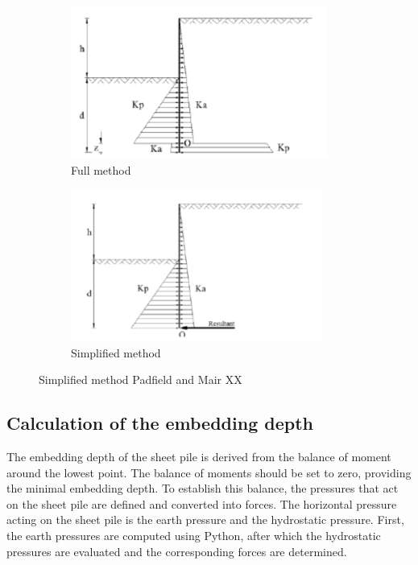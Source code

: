 \begin{figure}[H]
    \centering
    \begin{subfigure}[b]{0.45\textwidth}
        \includegraphics[width=\linewidth, height=5cm]{figures/ch8/blum_1.png}
        \caption{Full method}
        \label{fig:conventional_design}
    \end{subfigure}
    \begin{subfigure}[b]{0.45\textwidth}
        \includegraphics[width=\linewidth, height=5cm]{figures/ch8/blum_2.png}
        \caption{Simplified method}
        \label{fig:blum_simplification}
    \end{subfigure}
    \caption{Simplified method Padfield and Mair XX}
    \label{fig:blum}
\end{figure}

\subsection{Calculation of the embedding depth}
\label{section:embedding_depth}

The embedding depth of the sheet pile is derived from the balance of moment around the lowest point. The balance of moments should be set to zero, providing the minimal embedding depth. To establish this balance, the pressures that act on the sheet pile are defined and converted into forces. The horizontal pressure acting on the sheet pile is the earth pressure and the hydrostatic pressure. First, the earth pressures are computed using Python, after which the hydrostatic pressures are evaluated and the corresponding forces are determined. 

